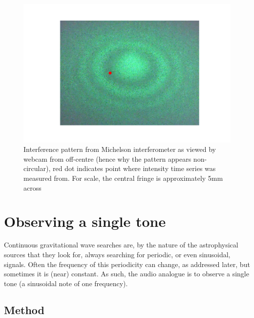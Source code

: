 \documentclass[prb,preprint]{revtex4-1}
\begin{document}
\begin{figure}
	\includegraphics[width=\textwidth]{figures/webcam_still0.pdf}
	\caption{Interference pattern from Michelson interferometer as viewed by webcam from off-centre (hence why the pattern appears non-circular), red dot indicates point where intensity time series was measured from. For scale, the central fringe is approximately 5mm across}
	\label{fig:interference_pattern}
\end{figure}


\section{Observing a single tone}
\label{sec:single_tone}

Continuous gravitational wave searches are, by the nature of the astrophysical sources that they look for, always searching for periodic, or even sinusoidal, signals. Often the frequency of this periodicity can change, as addressed later, but sometimes it is (near) constant. As such, the audio analogue is to observe a single tone (a sinusoidal note of one frequency).

\subsection{Method}
\end{document}

